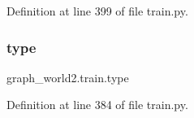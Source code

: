 Definition at line 399 of file train.\+py.

\mbox{\label{namespacegraph__world2_1_1train_a5483dc050b195034e046160fcc2155c5}} 
\subsubsection{\texorpdfstring{type}{type}}
{\footnotesize\ttfamily graph\+\_\+world2.\+train.\+type}



Definition at line 384 of file train.\+py.

